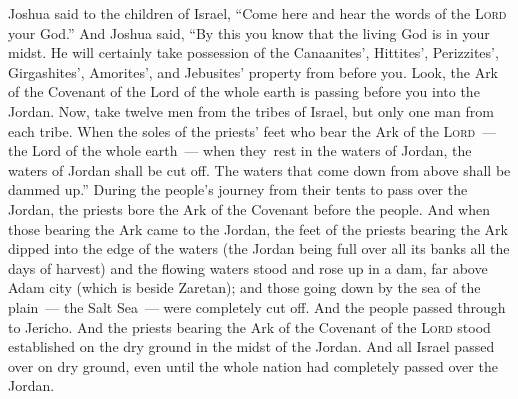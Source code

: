 \begin{inparaenum}
   Joshua said to the children of Israel, ``Come here and hear the words of the \textsc{Lord} your God.''%
   And Joshua said, ``By this you know that the living God is in your midst. He will certainly take possession of the Canaanites', Hittites', Perizzites', Girgashites', Amorites', and Jebusites' property from before you.%
   Look, the Ark of the Covenant of the Lord of the whole earth is passing before you into the Jordan.%
   Now, take twelve men from the tribes of Israel, but only one man from each tribe.%
   When the soles of the priests' feet who bear the Ark of the \textsc{Lord}~--- the Lord of the whole earth~--- when they\understood\ rest in the waters of Jordan, the waters of Jordan shall be cut off. The waters that come down from above shall be dammed up.''%
   During the people's journey from their tents to pass over the Jordan, the priests bore the Ark of the Covenant before the people.%
   And when those bearing the Ark came to the Jordan, the feet of the priests bearing the Ark dipped into the edge of the waters (the Jordan being full over all its banks all the days of harvest)%
   and the flowing waters stood and rose up in a dam, far above Adam city (which is beside Zaretan); and those going down by the sea of the plain~--- the Salt Sea~--- were completely cut off. And the people passed through to Jericho.%
   And the priests bearing the Ark of the Covenant of the \textsc{Lord} stood established on the dry ground in the midst of the Jordan. And all Israel passed over on dry ground, even until the whole nation had completely passed over the Jordan.%
\end{inparaenum}

